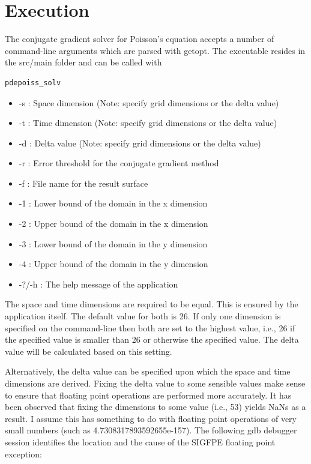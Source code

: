 \documentclass[12pt,a4paper]{report}
\begin{document}
\section{Execution}
\label{sec:execution}

The conjugate gradient solver for Poisson's equation accepts a number
of command-line arguments which are parsed with getopt. The executable
resides in the src/main folder and can be
called with \begin{verbatim}pdepoiss_solv\end{verbatim}

\begin{itemize}
\item -s : Space dimension (Note: specify grid dimensions or the delta
  value)
\item -t : Time dimension (Note: specify grid dimensions or the delta
  value)
\item -d : Delta value (Note: specify grid dimensions or the delta
  value)
\item -r : Error threshold for the conjugate gradient method
\item -f : File name for the result surface
\item -1 : Lower bound of the domain in the x dimension
\item -2 : Upper bound of the domain in the x dimension
\item -3 : Lower bound of the domain in the y dimension
\item -4 : Upper bound of the domain in the y dimension
\item -?/-h : The help message of the application
\end{itemize}

The space and time dimensions are required to be equal. This is
ensured by the application itself. The default value for both is
26. If only one dimension is specified on the command-line then both
are set to the highest value, i.e., 26 if the specified value is
smaller than 26 or otherwise the specified value. The delta value will
be calculated based on this setting.

Alternatively, the delta value can be specified upon which the space
and time dimensions are derived. Fixing the delta value to some
sensible values make sense to ensure that floating point operations
are performed more accurately. It has been observed that fixing the
dimensions to some value (i.e., 53) yields NaNs as a result. I assume
this has something to do with floating point operations of very small
numbers (such as 4.7308317893592655e-157). The following gdb debugger
session identifies the location and the cause of the SIGFPE floating
point exception:
\end{document}
